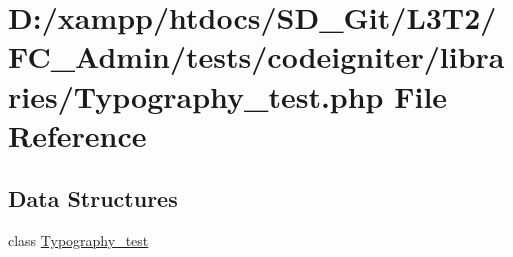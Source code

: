 \hypertarget{_admin_2tests_2codeigniter_2libraries_2_typography__test_8php}{}\section{D\+:/xampp/htdocs/\+S\+D\+\_\+\+Git/\+L3\+T2/\+F\+C\+\_\+\+Admin/tests/codeigniter/libraries/\+Typography\+\_\+test.php File Reference}
\label{_admin_2tests_2codeigniter_2libraries_2_typography__test_8php}
\subsection*{Data Structures}
\begin{DoxyCompactItemize}
\item 
class \hyperlink{class_typography__test}{Typography\+\_\+test}
\end{DoxyCompactItemize}
